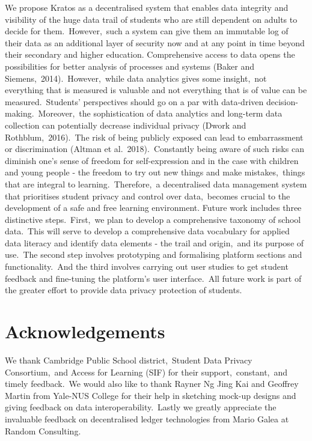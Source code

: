 \documentclass{article}
\begin{document}
\bigbreak
We propose Kratos as a decentralised system that enables data integrity and visibility of the huge data trail of students who are still dependent on adults to decide for them.\ However,\ such a system can give them an immutable log of their data as an additional layer of security now and at any point in time beyond their secondary and higher education.
\bigbreak
Comprehensive access to data opens the possibilities for better analysis of processes and systems (Baker and Siemens,\ 2014).\ However,\ while data analytics gives some insight,\ not everything that is measured is valuable and not everything that is of value can be measured.\ Students’ perspectives should go on a par with data-driven decision-making.\ Moreover,\ the sophistication of data analytics and long-term data collection can potentially decrease individual privacy (Dwork and Rothblum,\ 2016).\ The risk of being publicly exposed can lead to embarrassment or discrimination (Altman et al.\ 2018).\ Constantly being aware of such risks can diminish one’s sense of freedom for self-expression and in the case with children and young people - the freedom to try out new things and make mistakes,\ things that are integral to learning.\ Therefore,\ a decentralised data management system that prioritises student privacy and control over data,\ becomes crucial to the development of a safe and free learning environment.
\bigbreak
Future work includes three distinctive steps.\ First,\ we plan to develop a comprehensive taxonomy of school data.\ This will serve to develop a comprehensive data vocabulary for applied data literacy and identify data elements - the trail and origin,\ and its purpose of use.\ The second step involves prototyping and formalising platform sections and functionality.\ And the third involves carrying out user studies to get student feedback and fine-tuning the platform's user interface.\ All future work is part of the greater effort to provide data privacy protection of students.\ 

\section{Acknowledgements}
We thank Cambridge Public School district,\ Student Data Privacy Consortium,\ and Access for Learning (SIF) for their support,\ constant,\ and timely feedback.\ We would also like to thank Rayner Ng Jing Kai and Geoffrey Martin from Yale-NUS College for their help in sketching mock-up designs and giving feedback on data interoperability.\ Lastly we greatly appreciate the invaluable feedback on decentralised ledger technologies from Mario Galea at Random Consulting.
\end{document}
